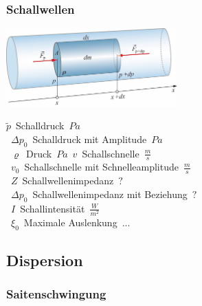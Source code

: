 \subsubsection{Schallwellen}
\begin{center}
	\begin{minipage}{0.2\textwidth}
	\end{minipage}%
	\begin{minipage}{0.3\textwidth}
		\includegraphics[height=3cm,right,keepaspectratio=true]{Images/schallwellen_kinematik_newton.png}
	\end{minipage}
\end{center}

\unit{$\tilde{p}$}{Schalldruck}{$Pa$}\\
\unit{$\Delta p_0$}{Schalldruck mit Amplitude}{$Pa$}\\
\unit{$\varrho$}{Druck}{$Pa$}
\unit{$v$}{Schallschnelle}{$\frac{m}{s}$}\\
\unit{$v_0$}{Schallschnelle mit Schnelleamplitude}{$\frac{m}{s}$}\\
\unit{$Z$}{Schallwellenimpedanz}{$?$}\\
\unit{$\Delta p_0$}{Schallwellenimpedanz mit Beziehung}{$?$}\\
\unit{$I$}{Schallintensität}{$\frac{W}{m^2}$}\\
\unit{$\xi_0$}{Maximale Auslenkung}{$...$}





\subsection{Dispersion}
\subsubsection{Saitenschwingung}
